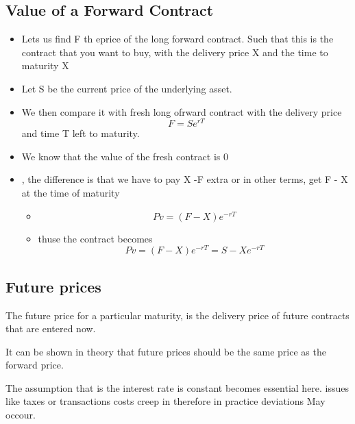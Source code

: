 \documentclass{article}
\theoremstyle{mytheoremstyle}
\theoremstyle{mytheoremstyle}
\theoremstyle{myproblemstyle}
\begin{document}
\subsection{Value of a Forward Contract}
\begin{itemize}
	\item Lets us find F th eprice of the long forward contract. Such that this is the contract that you want to buy, with the delivery price X and the time to maturity X
	\item Let S be the current price of the underlying asset.
	\item We then compare it with fresh long ofrward contract with the delivery price  $$ F = Se^{rT} $$ and  time T left to maturity.
	\item We know that the value of the fresh contract is 0
	      \item, the difference is that we have to pay X -F extra or in other terms, get F - X at the time of maturity
	      \begin{itemize}
		      \item $$ Pv = (F - X)e^{-rT} $$
		      \item thuse the contract becomes  $$ Pv = (F - X)e^{-rT} = S - Xe^{-rT} $$
	      \end{itemize}
\end{itemize}

\subsection{Future prices}
The future price for a particular maturity, is the delivery price of future contracts that are entered now.

It can be shown in theory that future prices should be the same price as the forward price.

The assumption that is the interest rate is constant becomes essential here.
issues like taxes or transactions costs creep in
therefore in practice deviations May occour.
\end{document}
